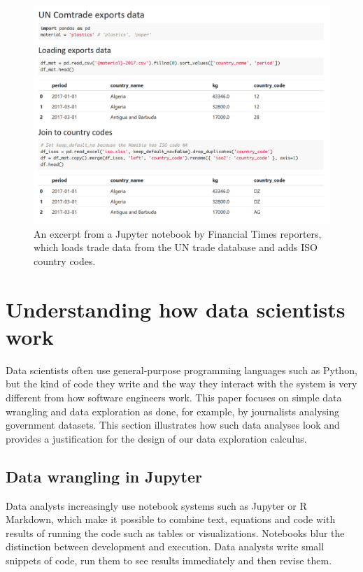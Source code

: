 \documentclass[acmsmall,anonymous,fleqn]{acmart}\settopmatter{printfolios=false,printccs=false,printacmref=false}
\theoremstyle{plain}
\theoremstyle{definition}
\begin{document}
\begin{figure}[b]
\includegraphics[scale=0.5]{notebook.png}
\caption{An excerpt from a Jupyter notebook by Financial Times reporters, which loads trade
  data from the UN trade database and adds ISO country codes.}
\label{fig:ft-uncomtrade}
\end{figure}

\section{Understanding how data scientists work}
\label{sec:background}

Data scientists often use general-purpose programming languages such as Python, but the kind of
code they write and the way they interact with the system is very different from how software
engineers work. This paper focuses on simple data wrangling and data exploration as done, for
example, by journalists analysing government datasets. This section illustrates how such data
analyses look and provides a justification for the design of our data exploration calculus.


\subsection{Data wrangling in Jupyter}
\label{sec:background-jupyter}

Data analysts increasingly use notebook systems such as Jupyter or R Markdown, which
make it possible to combine text, equations and code with results of running the code such as tables
or visualizations. Notebooks blur the distinction between development and execution.
Data analysts write small snippets of code, run them to see results immediately and then revise
them.
\end{document}
